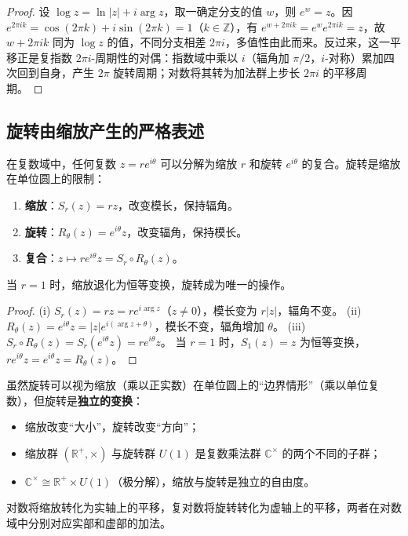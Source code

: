\begin{proof}
设 $\log z = \ln|z| + i\arg z$，取一确定分支的值 $w$，则 $e^w = z$。因 $e^{2\pi i k} = \cos(2\pi k) + i\sin(2\pi k) = 1$（$k\in\mathbb{Z}$），有 $e^{w + 2\pi i k} = e^w e^{2\pi i k} = z$，故 $w + 2\pi i k$ 同为 $\log z$ 的值，不同分支相差 $2\pi i$，多值性由此而来。反过来，这一平移正是复指数 $2\pi i$-周期性的对偶：指数域中乘以 $i$（辐角加 $\pi/2$，$i$-对称）累加四次回到自身，产生 $2\pi$ 旋转周期；对数将其转为加法群上步长 $2\pi i$ 的平移周期。
\end{proof}

\subsection{\texorpdfstring{旋转由缩放产生的严格表述}{旋转由缩放产生的严格表述}}

\begin{proposition}[旋转由缩放产生的严格表述]\label{prop:rotation_from_scaling}
在复数域中，任何复数 $z = re^{i\theta}$ 可以分解为缩放 $r$ 和旋转 $e^{i\theta}$ 的复合。旋转是缩放在单位圆上的限制：
\begin{enumerate}[label=(\roman*)]
    \item \textbf{缩放}：$S_r(z) = rz$，改变模长，保持辐角。
    \item \textbf{旋转}：$R_\theta(z) = e^{i\theta}z$，改变辐角，保持模长。
    \item \textbf{复合}：$z \mapsto re^{i\theta}z = S_r \circ R_\theta(z)$。
\end{enumerate}
当 $r = 1$ 时，缩放退化为恒等变换，旋转成为唯一的操作。
\end{proposition}

\begin{proof}
(i) $S_r(z) = rz = re^{i\arg z}$（$z \neq 0$），模长变为 $r|z|$，辐角不变。
(ii) $R_\theta(z) = e^{i\theta}z = |z|e^{i(\arg z + \theta)}$，模长不变，辐角增加 $\theta$。
(iii) $S_r \circ R_\theta(z) = S_r(e^{i\theta}z) = re^{i\theta}z$。
当 $r = 1$ 时，$S_1(z) = z$ 为恒等变换，$re^{i\theta}z = e^{i\theta}z = R_\theta(z)$。
\end{proof}

\begin{remark}[旋转的独立性]\label{rem:rotation_independence}
虽然旋转可以视为缩放（乘以正实数）在单位圆上的“边界情形”（乘以单位复数），但旋转是\textbf{独立的变换}：
\begin{itemize}
    \item 缩放改变“大小”，旋转改变“方向”；
    \item 缩放群 $(\mathbb{R}^+,\times)$ 与旋转群 $U(1)$ 是复数乘法群 $\mathbb{C}^{\times}$ 的两个不同的子群；
    \item $\mathbb{C}^{\times} \cong \mathbb{R}^+ \times U(1)$（极分解），缩放与旋转是独立的自由度。
\end{itemize}
对数将缩放转化为实轴上的平移，复对数将旋转转化为虚轴上的平移，两者在对数域中分别对应实部和虚部的加法。
\end{remark}

